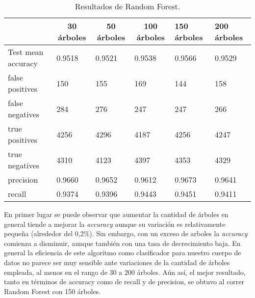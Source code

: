 \documentclass[10pt,a4paper]{article}
\begin{document}
\begin{table}[H]
	\centering
	\begin{tabular}{|l|l|l|l|l|l|}
		\hline
		\multicolumn{1}{|c|}{\textbf{}} & \multicolumn{1}{c|}{\textbf{30 árboles}} & \multicolumn{1}{c|}{\textbf{50 árboles}} & \multicolumn{1}{c|}{\textbf{100 árboles}} & \textbf{150 árboles} & \textbf{200 árboles} \\ \hline
		Test mean accuracy              & 0.9518                                   & 0.9521                                   & 0.9538                                    & 0.9566               & 0.9529               \\ \hline
		false positives                 & 150                                      & 155                                      & 169                                       & 144                  & 158                  \\ \hline
		false negatives                 & 284                                      & 276                                      & 247                                       & 247                  & 266                  \\ \hline
		true positives                  & 4256                                     & 4296                                     & 4187                                      & 4256                 & 4247                 \\ \hline
		true negatives                  & 4310                                     & 4123                                     & 4397                                      & 4353                 & 4329                 \\ \hline
		precision                       & 0.9660                                   & 0.9652                                   & 0.9612                                    & 0.9673               & 0.9641               \\ \hline
		recall                          & 0.9374                                   & 0.9396                                   & 0.9443                                    & 0.9451               & 0.9411               \\ \hline
	\end{tabular}
		\caption{Resultados de Random Forest.}
		\label{rf}
\end{table}

En primer lugar se puede observar que aumentar la cantidad de árboles en general tiende a mejorar la \textit{accuracy} aunque su variación es relativamente pequeña (alrededor del 0,2\%). Sin embargo, con un exceso de arboles la \textit{accuracy} comienza a disminuir, aunque también con una tasa de decrecimiento baja. En general la eficiencia de este algoritmo como clasificador para nuestro cuerpo de datos no parece ser muy sensible ante variaciones de la cantidad de árboles empleada, al menos en el rango de 30 a 200 árboles. Aún así, el mejor resultado, tanto en términos de accuracy como de recall y de precision, se obtuvo al correr Random Forest con 150 árboles.
\end{document}
